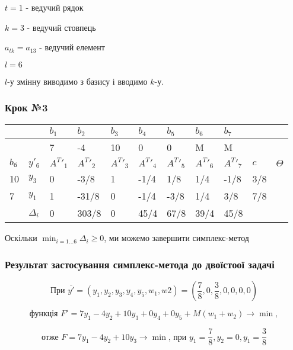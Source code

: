 \documentclass[a4paper, 12pt]{article}
\begin{document}
$t = 1$ - ведучий рядок

$k = 3$ - ведучий стовпець

$a_{tk} = a_{13}$ - ведучий елемент

$l = 6$

$l$-у змінну виводимо з базису і вводимо $k$-у.

\subsubsection{Крок №3}

\begin{table}[H]
    \centering
    \begin{tabular}{|l|l|l|l|l|l|l|l|l|l|l|}
    \hline
         &  & $b_1$ & $b_2$ & $b_3$ & $b_4$ & $b_5$ & $b_6$ & $b_7$ & & \\ \hline
         &  & 7 & -4 & 10 & 0 & 0 & M & M & &  \\ \hline
         $b_\text{б}$ & $y'_\text{б}$ & $A^T{'}_1$ & $A^T{'}_2$ & $A^T{'}_3$ & $A^T{'}_4$ & $A^T{'}_5$ & $A^T{'}_6$ & $A^T{'}_7$ & $c$  & $\Theta$ \\ \hline
        10 & $y_3$ & 0 & -3/8 & 1 & -1/4 & 1/8 & 1/4 & -1/8 & 3/8 & \\ \hline
        7 & $y_1$ & 1 & -31/8 & 0 & -1/4 & -3/8 & 1/4 & 3/8 & 7/8 & \\ \hline
         & $\Delta_i$ & 0 & 303/8 & 0 & 45/4 & 67/8 & 39/4 & 45/8 & & \\ \hline
    \end{tabular}
\end{table}

Оскільки $\min_{i=1 \dots 6} \Delta_i \geqslant 0$, ми можемо завершити симплекс-метод

\subsubsection{Результат застосування симплекс-метода до двоїстоої задачі}


\begin{equation*}
\text{При }\overline{y'} = \left(y_1, y_2, y_3, y_4, y_5, w_1, w2 \right) = \left(\frac{7}{8}, 0, \frac{3}{8}, 0, 0, 0, 0\right)
\end{equation*}

\begin{equation*}
\text{функція }F' = 7y_1 - 4y_2 + 10y_3 + 0y_4 + 0y_5 + M(w_1 + w_2) \rightarrow \min,
\end{equation*}


\begin{equation*}
\text{отже }F = 7y_1 - 4y_2 + 10y_3 \rightarrow \min \text{, при } y_1 = \frac{7}{8}, y_2 = 0, y_1 = \frac{3}{8}
\end{equation*}
\end{document}
